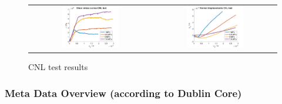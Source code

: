\begin{figure}[!ht]
\begin{tabular}{cc}
\includegraphics[width=0.48\textwidth]{./figures/CNLShearCurvesAll.png}     
& 
\includegraphics[width=0.48\textwidth]{./figures/CNLDilatationAll.png} 
\end{tabular}
\caption{CNL test results}
\label{fig:DataCNLGraniteLab}
\end{figure}

\clearpage
\subsubsection*{Meta Data Overview (according to Dublin Core)}

